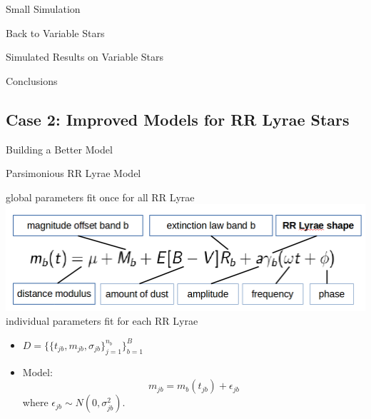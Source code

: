 \documentclass[12pt]{beamer}
\begin{document}
\begin{frame}{Small Simulation}

\end{frame}

\begin{frame}{Back to Variable Stars}

\end{frame}

\begin{frame}{Simulated Results on Variable Stars}

\end{frame}

\begin{frame}{Conclusions}

\end{frame}




\subsection{Case 2: Improved Models for RR Lyrae Stars}

\begin{frame}{Building a Better Model}

\end{frame}

\begin{frame}{Parsimonious RR Lyrae Model}


\begin{center}
global parameters fit once for all RR Lyrae\\
\includegraphics[scale=.3]{figs/model.png}\\
individual parameters fit for each RR Lyrae
\end{center}

\vspace{.2in}

\begin{itemize}
\item $D=\{\{t_{jb},m_{jb},\sigma_{jb}\}_{j=1}^{n_b}\}_{b=1}^B$
\item Model:
\begin{equation*}
m_{jb} = m_b(t_{jb}) + \epsilon_{jb}
\end{equation*}
where $\epsilon_{jb} \sim N(0,\sigma_{jb}^2)$.
\end{itemize}
\end{frame}
\end{document}
